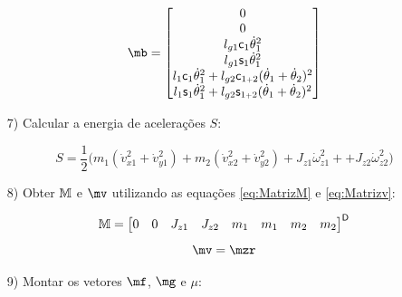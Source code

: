 \documentclass[a4paper,11pt,brazil,fleqn]{article}
\begin{document}
\begin{itemize}
\begin{equation}
\mb =
\begin{bmatrix}
0 \\
0 \\
l_{g1} \ccos_1 \dot{\theta}_1^2 \\
l_{g1} \ssin_1 \dot{\theta}_1^2 \\
l_{1} \ccos_1 \dot{\theta}_1^2  + l_{g2} \ccos_{1\plus 2}  (\dot{\theta}_1+\dot{\theta}_2)^2 \\
l_{1} \ssin_1  \dot{\theta}_1^2 + l_{g2} \ssin_{1\plus 2}   (\dot{\theta}_1+\dot{\theta}_2)^2 \\
\end{bmatrix}
\end{equation}

\item[7)] Calcular a energia de acelera\c{c}\~oes $S$:

\begin{equation}
S = \frac{1}{2} \Big( m_1 (\dot{v}_{x1}^2 + \dot{v}_{y1}^2) + m_2 (\dot{v}_{x2}^2 + \dot{v}_{y2}^2) + J_{z1} \dot{\omega}_{z1}^2 + + J_{z2} \dot{\omega}_{z2}^2 \Big)
\end{equation}

\item[8)] Obter $\mathbb{M}$ e $\mv$ utilizando as equa\c{c}\~oes \eqref{eq:MatrizM} e \eqref{eq:Matrizv}:

\begin{equation}
\mathbb{M} = \begin{bmatrix}
0 & 0 & J_{z1} & J_{z2} & m_1 & m_1 & m_2 & m_2
\end{bmatrix}^{\mathsf{D}}
\end{equation}
\begin{equation}
\mv = \mzr
\end{equation}

\item[9)] Montar os vetores $\mf$, $\mg$ e $\mu$:


\end{itemize}
\end{document}
